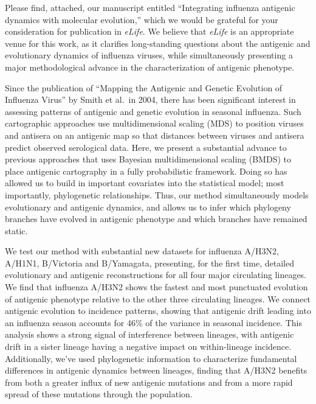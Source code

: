 \documentclass[stdletter,letterpaper,addrfromright,orderfromdateto,dateleft,11pt,noaddrto,sigleft]{newlfm}
\begin{document}
\begin{newlfm}

Please find, attached, our manuscript entitled ``Integrating influenza antigenic dynamics with molecular evolution,'' which we would be grateful for your consideration for publication in \textit{eLife}.  
We believe that \textit{eLife} is an appropriate venue for this work, as it clarifies long-standing questions about the antigenic and evolutionary dynamics of influenza viruses, while simultaneously presenting a major methodological advance in the characterization of antigenic phenotype.

Since the publication of ``Mapping the Antigenic and Genetic Evolution of Influenza Virus'' by Smith et al.\ in 2004, there has been significant interest in assessing patterns of antigenic and genetic evolution in seasonal influenza.
Such cartographic approaches use multidimensional scaling (MDS) to position viruses and antisera on an antigenic map so that distances between viruses and antisera predict observed serological data.
Here, we present a substantial advance to previous approaches that uses Bayesian multidimensional scaling (BMDS) to place antigenic cartography in a fully probabilistic framework.
Doing so has allowed us to build in important covariates into the statistical model; most importantly, phylogenetic relationships.
Thus, our method simultaneously models evolutionary and antigenic dynamics, and allows us to infer which phylogeny branches have evolved in antigenic phenotype and which branches have remained static.

We test our method with substantial new datasets for influenza A/H3N2, A/H1N1, B/Victoria and B/Yamagata, presenting, for the first time, detailed evolutionary and antigenic reconstructions for all four major circulating lineages.
We find that influenza A/H3N2 shows the fastest and most punctuated evolution of antigenic phenotype relative to the other three circulating lineages.
We connect antigenic evolution to incidence patterns, showing that antigenic drift leading into an influenza season accounts for 46\% of the variance in seasonal incidence.
This analysis shows a strong signal of interference between lineages, with antigenic drift in a sister lineage having a negative impact on within-lineage incidence.
Additionally, we've used phylogenetic information to characterize fundamental differences in antigenic dynamics between lineages, finding that A/H3N2 benefits from both a greater influx of new antigenic mutations and from a more rapid spread of these mutations through the population.


\end{newlfm}
\end{document}
